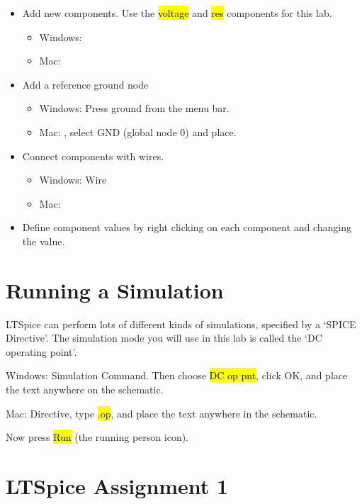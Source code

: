 \documentclass{article}
\begin{document}
\begin{itemize}
  \item Add new components. Use the \hl{voltage} and \hl{res} components for this lab.
    \begin{itemize}
      \item Windows: 
      \item Mac: 
    \end{itemize}
  \item Add a reference ground node
    \begin{itemize}
      \item Windows: Press ground from the menu bar.
      \item Mac: , select GND (global node 0) and place.
    \end{itemize}
  \item Connect components with wires.
    \begin{itemize}
      \item Windows:  Wire
      \item Mac: 
    \end{itemize}
  \item Define component values by right clicking on each component and changing
    the value.

\end{itemize}

\section{Running a Simulation}

LTSpice can perform lots of different kinds of simulations, specified by a `SPICE Directive'. The simulation mode you will use in this lab is called the `DC operating point'.

Windows:  Simulation Command. Then choose \hl{DC op pnt}, click OK, and place the text anywhere on the schematic.

Mac:  Directive, type \hl{.op}, and place the text anywhere in the schematic.

Now press \hl{Run} (the running person icon).

\section{LTSpice Assignment 1}
\end{document}
